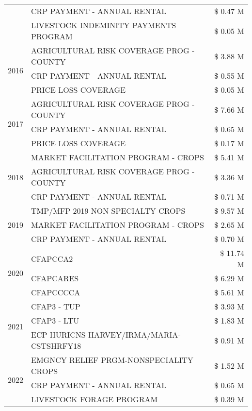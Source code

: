 \begin{tabular}{llr}
 & CRP PAYMENT - ANNUAL RENTAL & \$ 0.47 M \\
 & LIVESTOCK INDEMINITY PAYMENTS PROGRAM & \$ 0.05 M \\
\cline{1-3}
\multirow[t]{3}{*}{2016} & AGRICULTURAL RISK COVERAGE PROG - COUNTY & \$ 3.88 M \\
 & CRP PAYMENT - ANNUAL RENTAL & \$ 0.55 M \\
 & PRICE LOSS COVERAGE & \$ 0.05 M \\
\cline{1-3}
\multirow[t]{3}{*}{2017} & AGRICULTURAL RISK COVERAGE PROG - COUNTY & \$ 7.66 M \\
 & CRP PAYMENT - ANNUAL RENTAL & \$ 0.65 M \\
 & PRICE LOSS COVERAGE & \$ 0.17 M \\
\cline{1-3}
\multirow[t]{3}{*}{2018} & MARKET FACILITATION PROGRAM - CROPS & \$ 5.41 M \\
 & AGRICULTURAL RISK COVERAGE PROG - COUNTY & \$ 3.36 M \\
 & CRP PAYMENT - ANNUAL RENTAL & \$ 0.71 M \\
\cline{1-3}
\multirow[t]{3}{*}{2019} & TMP/MFP 2019 NON SPECIALTY CROPS & \$ 9.57 M \\
 & MARKET FACILITATION PROGRAM - CROPS & \$ 2.65 M \\
 & CRP PAYMENT - ANNUAL RENTAL & \$ 0.70 M \\
\cline{1-3}
\multirow[t]{3}{*}{2020} & CFAPCCA2 & \$ 11.74 M \\
 & CFAPCARES & \$ 6.29 M \\
 & CFAPCCCCA & \$ 5.61 M \\
\cline{1-3}
\multirow[t]{3}{*}{2021} & CFAP3 - TUP & \$ 3.93 M \\
 & CFAP3 - LTU & \$ 1.83 M \\
 & ECP HURICNS HARVEY/IRMA/MARIA-CSTSHRFY18 & \$ 0.91 M \\
\cline{1-3}
\multirow[t]{3}{*}{2022} & EMGNCY RELIEF PRGM-NONSPECIALITY CROPS & \$ 1.52 M \\
 & CRP PAYMENT - ANNUAL RENTAL & \$ 0.65 M \\
 & LIVESTOCK FORAGE PROGRAM & \$ 0.39 M \\
\cline{1-3}
\bottomrule
\end{tabular}
